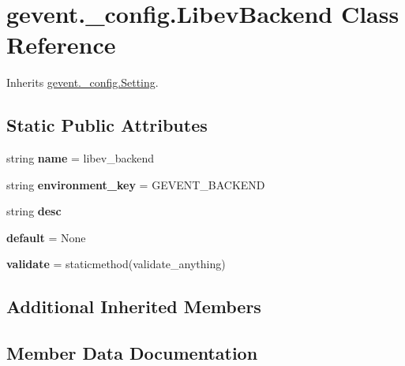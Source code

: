 \hypertarget{classgevent_1_1__config_1_1_libev_backend}{}\section{gevent.\+\_\+config.\+Libev\+Backend Class Reference}
\label{classgevent_1_1__config_1_1_libev_backend}


Inherits \hyperlink{classgevent_1_1__config_1_1_setting}{gevent.\+\_\+config.\+Setting}.

\subsection*{Static Public Attributes}
\begin{DoxyCompactItemize}
\item 
\mbox{\label{classgevent_1_1__config_1_1_libev_backend_afd85cf6f9801df02f7ee6050e55337e2}} 
string {\bfseries name} = \textquotesingle{}libev\+\_\+backend\textquotesingle{}
\item 
\mbox{\label{classgevent_1_1__config_1_1_libev_backend_ad56285c2bc8f3142cfe65b70395c109b}} 
string {\bfseries environment\+\_\+key} = \textquotesingle{}G\+E\+V\+E\+N\+T\+\_\+\+B\+A\+C\+K\+E\+ND\textquotesingle{}
\item 
string {\bfseries desc}
\item 
\mbox{\label{classgevent_1_1__config_1_1_libev_backend_ab3c6186044d06bf40bd2e75bccf2f58b}} 
{\bfseries default} = None
\item 
\mbox{\label{classgevent_1_1__config_1_1_libev_backend_aa613821941a3d781b8fcba8ca38d6e8e}} 
{\bfseries validate} = staticmethod(validate\+\_\+anything)
\end{DoxyCompactItemize}
\subsection*{Additional Inherited Members}


\subsection{Member Data Documentation}
\mbox{\label{classgevent_1_1__config_1_1_libev_backend_a3c57cbfb2d6649218f2916fe5b3ee88a}} 
